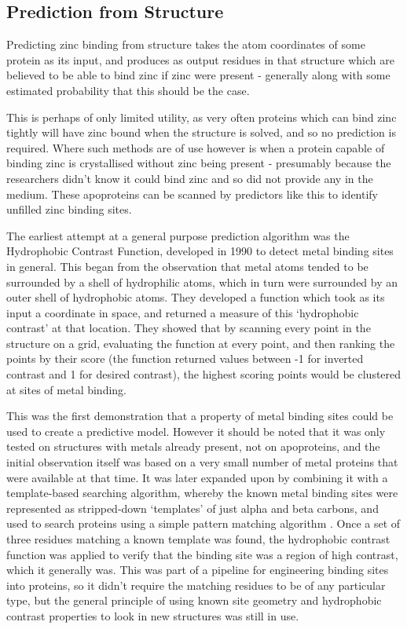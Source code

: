 \subsection{Prediction from Structure}

Predicting zinc binding from structure takes the atom coordinates of some protein as its input, and produces as output residues in that structure which are believed to be able to bind zinc if zinc were present - generally along with some estimated probability that this should be the case.

This is perhaps of only limited utility, as very often proteins which can bind zinc tightly will have zinc bound when the structure is solved, and so no prediction is required. Where such methods are of use however is when a protein capable of binding zinc is crystallised without zinc being present - presumably because the researchers didn't know it could bind zinc and so did not provide any in the medium. These apoproteins can be scanned by predictors like this to identify unfilled zinc binding sites.

The earliest attempt at a general purpose prediction algorithm was the Hydrophobic Contrast Function, developed in 1990 \cite{yamashita1990metal} to detect metal binding sites in general. This began from the observation that metal atoms tended to be surrounded by a shell of hydrophilic atoms, which in turn were surrounded by an outer shell of hydrophobic atoms. They developed a function which took as its input a coordinate in space, and returned a measure of this `hydrophobic contrast' at that location. They showed that by scanning every point in the structure on a grid, evaluating the function at every point, and then ranking the points by their score (the function returned values between -1 for inverted contrast and 1 for desired contrast), the highest scoring points would be clustered at sites of metal binding.

This was the first demonstration that a property of metal binding sites could be used to create a predictive model. However it should be noted that it was only tested on structures with metals already present, not on apoproteins, and the initial observation itself was based on a very small number of metal proteins that were available at that time. It was later expanded upon by combining it with a template-based searching algorithm, whereby the known metal binding sites were represented as stripped-down `templates' of just alpha and beta carbons, and used to search proteins using a simple pattern matching algorithm \cite{gregory1993prediction}. Once a set of three residues matching a known template was found, the hydrophobic contrast function was applied to verify that the binding site was a region of high contrast, which it generally was. This was part of a pipeline for engineering binding sites into proteins, so it didn't require the matching residues to be of any particular type, but the general principle of using known site geometry and hydrophobic contrast properties to look in new structures was still in use.

